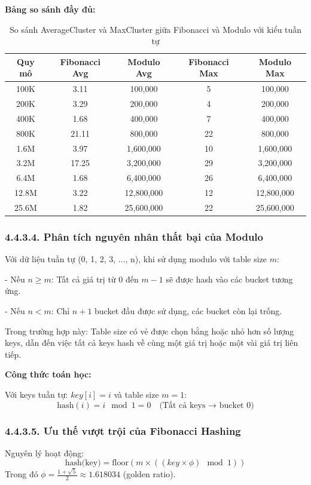 \documentclass[12pt,a4paper]{report}
\begin{document}
\noindent \indent \textbf{Bảng so sánh đầy đủ:}

\begin{table}[ht]
\centering
\begin{tabular}{|c|c|c|c|c|}
\hline
\textbf{Quy mô} & \textbf{Fibonacci Avg} & \textbf{Modulo Avg} & \textbf{Fibonacci Max} & \textbf{Modulo Max}  \\
\hline
100K & 3.11 & 100,000 & 5 & 100,000  \\
200K & 3.29 & 200,000 & 4 & 200,000  \\
400K & 1.68 & 400,000 & 7 & 400,000  \\
800K & 21.11 & 800,000 & 22 & 800,000  \\
1.6M & 3.97 & 1,600,000 & 10 & 1,600,000  \\
3.2M & 17.25 & 3,200,000 & 29 & 3,200,000  \\
6.4M & 1.68 & 6,400,000 & 26 & 6,400,000  \\
12.8M & 3.22 & 12,800,000 & 12 & 12,800,000  \\
25.6M & 1.82 & 25,600,000 & 22 & 25,600,000  \\
\hline
\end{tabular}
\caption{So sánh AverageCluster và MaxCluster giữa Fibonacci và Modulo với kiểu tuần tự}
\end{table}

\newpage
\subsubsection*{4.4.3.4. Phân tích nguyên nhân thất bại của Modulo}
\noindent \indent Với dữ liệu tuần tự (0, 1, 2, 3, ..., n), khi sử dụng modulo với table size $m$:

    - Nếu $n \geq m$: Tất cả giá trị từ 0 đến $m-1$ sẽ được hash vào các bucket tương ứng.
    
    - Nếu $n < m$: Chỉ $n+1$ bucket đầu được sử dụng, các bucket còn lại trống.


Trong trường hợp này: Table size có vẻ được chọn bằng hoặc nhỏ hơn số lượng keys, dẫn đến việc tất cả keys hash về cùng một giá trị hoặc một vài giá trị liên tiếp.

\textbf{Công thức toán học:}  

Với keys tuần tự: $key[i] = i$ và table size $m = 1$:  
\[
\text{hash}(i) = i \mod 1 = 0 \quad \text{(Tất cả keys → bucket 0)}
\]

\subsubsection*{4.4.3.5. Ưu thế vượt trội của Fibonacci Hashing}
\noindent \indent Nguyên lý hoạt động:
\[
\text{hash(key)} = \text{floor}(m \times ((key \times \phi) \mod 1))
\]
Trong đó $\phi = \frac{1 + \sqrt{5}}{2} \approx 1.618034$ (golden ratio).
\end{document}

